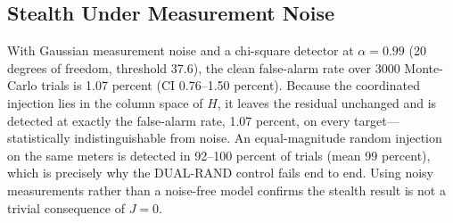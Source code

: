 \documentclass{ieeeaccess}
\begin{document}
\subsection{Stealth Under Measurement Noise}
With Gaussian measurement noise and a chi-square detector at $\alpha{=}0.99$ (20 degrees of freedom, threshold 37.6), the clean false-alarm rate over 3000 Monte-Carlo trials is 1.07 percent (CI 0.76--1.50 percent). Because the coordinated injection lies in the column space of $H$, it leaves the residual unchanged and is detected at exactly the false-alarm rate, 1.07 percent, on every target---statistically indistinguishable from noise. An equal-magnitude random injection on the same meters is detected in 92--100 percent of trials (mean 99 percent), which is precisely why the DUAL-RAND control fails end to end. Using noisy measurements rather than a noise-free model confirms the stealth result is not a trivial consequence of $J{=}0$.
\end{document}
